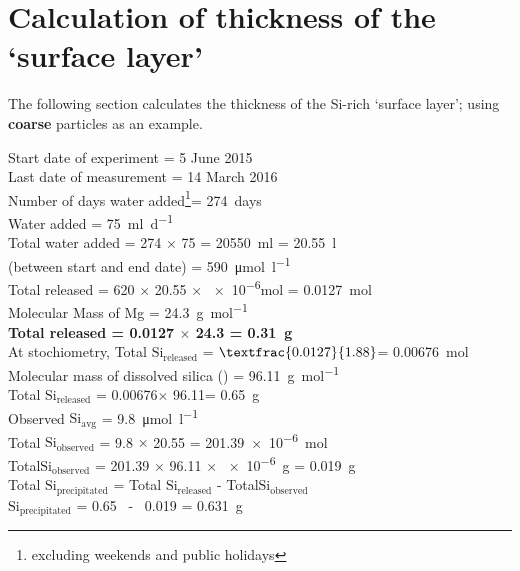 \section{Calculation of thickness of the `surface layer'}\label{sec:app_thickness}
The following section calculates the thickness of the Si-rich `surface layer'; using \textbf{coarse} particles as an example. 

Start date of experiment = 5 June 2015\\
Last date of measurement = 14 March 2016\\ 
Number of days water added\footnote{excluding weekends and public holidays}= \SI{274}{days}\\
Water added = \SI{75}{\milli\litre\per\day}\\
Total water added = \num{274} $\times$ \num{75} = \SI{20550}{\milli\litre} = \SI{20.55}{\litre}\\
 (between start and end date) = \SI{590}{\micro\mole\per\litre}\\
Total  released = \num{620} $\times$ \num{20.55} $\times$ \num{e-6}\si{\mole} = \SI{0.0127}{\mole}\\				
Molecular Mass of Mg = \SI{24.3}{\gram\per\mole}\\
\textbf{Total  released = \num{0.0127} $\times$ \num{24.3}  =  \SI{0.31}{\gram}}\\

\noindent At stochiometry, Total $\mathrm{Si_{released}}$ = $\textfrac{0.0127}{1.88}$= \SI{0.00676}{\mole}\\
Molecular mass of dissolved silica () = \SI{96.11}{\gram\per\mole}\\
Total $\mathrm{Si_{released}}$ = \num{0.00676}$\times$ \num{96.11}= \SI{0.65}{\gram} \\
Observed $\mathrm{Si_{avg}}$ = \SI{9.8}{\micro\mole\per\litre}\\
Total \;$\mathrm{Si_{observed}}$ = 9.8 $\times$ 20.55 = \SI{201.39e-6}{\mole}\\
Total$\mathrm{Si_{observed}}$ = 201.39 $\times$ 96.11 $\times$ \SI{e-6}{\gram} = \SI{0.019}{\gram}\\
Total $\mathrm{Si_{precipitated}}$ = Total $\mathrm{Si_{released}}$ - Total$\mathrm{Si_{observed}}$\\ 
$\mathrm{Si_{precipitated}}$ = 0.65 \ - \ 0.019 = \SI{0.631}{g}

